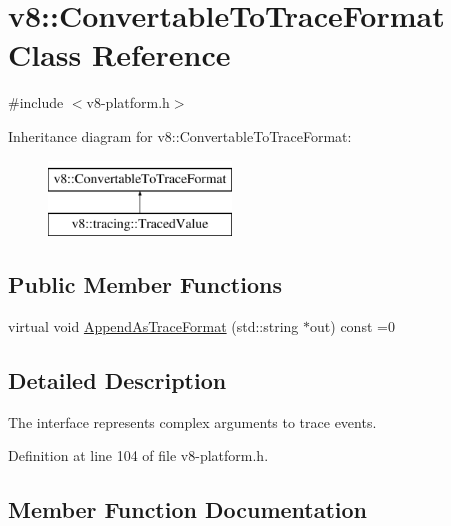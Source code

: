 \hypertarget{classv8_1_1ConvertableToTraceFormat}{}\section{v8\+:\+:Convertable\+To\+Trace\+Format Class Reference}
\label{classv8_1_1ConvertableToTraceFormat}


{\ttfamily \#include $<$v8-\/platform.\+h$>$}

Inheritance diagram for v8\+:\+:Convertable\+To\+Trace\+Format\+:\begin{figure}[H]
\begin{center}
\leavevmode
\includegraphics[height=2.000000cm]{classv8_1_1ConvertableToTraceFormat}
\end{center}
\end{figure}
\subsection*{Public Member Functions}
\begin{DoxyCompactItemize}
\item 
virtual void \mbox{\hyperlink{classv8_1_1ConvertableToTraceFormat_a11f3295df2906e09c1f266049d130013}{Append\+As\+Trace\+Format}} (std\+::string $\ast$out) const =0
\end{DoxyCompactItemize}


\subsection{Detailed Description}
The interface represents complex arguments to trace events. 

Definition at line 104 of file v8-\/platform.\+h.



\subsection{Member Function Documentation}
\mbox{\label{classv8_1_1ConvertableToTraceFormat_a11f3295df2906e09c1f266049d130013}} 
